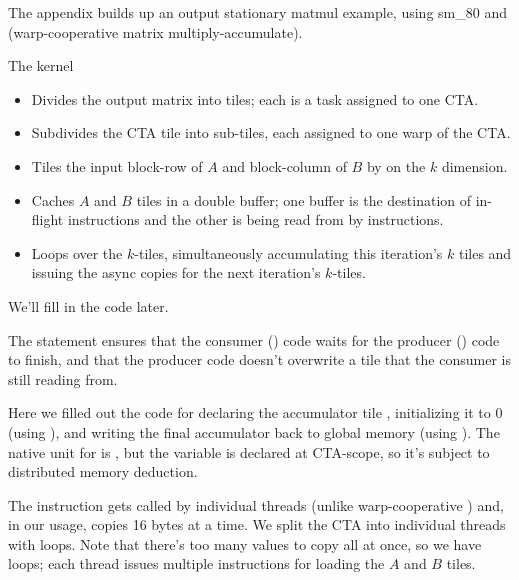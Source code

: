 \newpage
{}

The appendix builds up an output stationary matmul example, using sm\_80  and  (warp-cooperative matrix multiply-accumulate).

The kernel
\begin{itemize}
  \item Divides the output matrix into  tiles; each is a task assigned to one CTA.
  \item Subdivides the CTA tile into sub-tiles, each assigned to one warp of the CTA.
  \item Tiles the input block-row of $A$ and block-column of $B$ by  on the $k$ dimension.
  \item Caches $A$ and $B$ tiles in a double buffer; one buffer is the destination of in-flight  instructions and the other is being read from by  instructions.
  \item Loops over the $k$-tiles, simultaneously accumulating this iteration's $k$ tiles and issuing the async copies for the next iteration's $k$-tiles.
\end{itemize}

\newpage
{}

We'll fill in the  code later.

The \texttt{} statement ensures that the consumer () code waits for the producer () code to finish, and that the producer code doesn't overwrite a tile that the consumer is still reading from.



\newpage
{}

Here we filled out the code for declaring the accumulator tile , initializing it to 0 (using ), and writing the final accumulator back to global memory (using ). The native unit for  is , but the variable is declared at CTA-scope, so it's subject to distributed memory deduction.



\newpage
{}

The  instruction gets called by individual threads (unlike warp-cooperative ) and, in our usage, copies 16 bytes at a time.
We split the CTA into individual threads with  loops.
Note that there's too many values to copy all at once, so we have  loops; each thread issues multiple  instructions for loading the $A$ and $B$ tiles.

